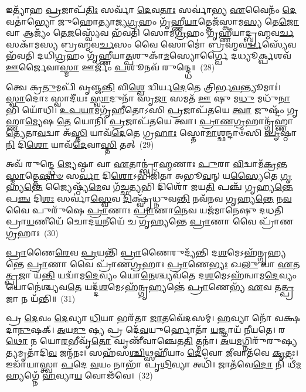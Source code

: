 𑌇𑌤𑍍𑌯𑌾᳴𑌹 \ul{𑌪𑍍𑌰}\-𑌜𑌾𑌪᳴\-\ul{𑌤𑌿𑌃} 𑌸𑌰𑍍𑌵𑌾᳴ \ul{𑌦𑍇}\-𑌵\-\ul{𑌤𑌾𑌃} 𑌸𑌰𑍍𑌵𑌾॑𑌭𑍍𑌯 \ul{𑌏}\-𑌵𑍈𑌨𑌂᳴ \ul{𑌦𑍇}\-𑌵𑌤𑌾॑𑌭𑍍𑌯𑍋 𑌜𑍁𑌹𑍋𑌤𑍍𑌯𑌾𑌜𑍍𑌯\-\ul{𑌗𑍍𑌰}\-𑌹𑌂 𑌗𑍃᳴𑌹𑍍𑌣𑍀\-\ul{𑌯𑌾}\-𑌤𑍍𑌤𑍇𑌜᳴𑌸𑍍𑌕𑌾𑌮\-\ul{𑌸𑍍𑌯} 𑌤𑍇\-\ul{𑌜𑍋} 𑌵𑌾 𑌆𑌜𑍍𑌯𑌂᳴ 𑌤𑍇\-\ul{𑌜}\-𑌸𑍍𑌵𑍍𑌯𑍇᳴𑌵 𑌭᳴𑌵𑌤𑌿 𑌸𑍋𑌮\-\ul{𑌗𑍍𑌰}\-𑌹𑌂 𑌗𑍃᳴𑌹𑍍𑌣𑍀𑌯𑌾𑌦𑍍𑌬𑍍𑌰𑌹𑍍𑌮𑌵\-\ul{𑌰𑍍𑌚}\-𑌸𑌕𑌾᳴𑌮𑌸𑍍𑌯 𑌬𑍍𑌰𑌹𑍍𑌮𑌵\-\ul{𑌰𑍍𑌚}\-𑌸𑌂 𑌵𑍈 𑌸𑍋𑌮𑍋॑ 𑌬𑍍𑌰𑌹𑍍𑌮𑌵\-\ul{𑌰𑍍𑌚}\-𑌸𑍍𑌯𑍇᳴𑌵 𑌭᳴𑌵𑌤𑌿 𑌦𑌧𑌿\-\ul{𑌗𑍍𑌰}\-𑌹𑌂 𑌗𑍃᳴𑌹𑍍𑌣𑍀𑌯𑌾\-\ul{𑌤𑍍𑌪}\-𑌶𑍁𑌕𑌾᳴\-\ul{𑌮}\-𑌸𑍍𑌯𑍋𑌰𑍍𑌗𑍍𑌵𑍈 𑌦𑌧𑍍𑌯𑍂\-\ul{𑌰𑍍𑌕𑍍𑌪}\-𑌶𑌵᳴ \ul{𑌊}\-𑌰𑍍𑌜𑍈𑌵𑌾\-\ul{𑌸𑍍𑌮𑌾} 𑌊𑌰𑍍𑌜𑌂᳴ \ul{𑌪}\-𑌶𑍂𑌨𑌵᳴ 𑌰𑍁𑌨𑍍𑌦𑍍𑌧𑍇॥~(28)

{\anuvakamend[{\-\ul{𑌉}\-\-\ul{𑌪}\-\-\ul{𑌯𑌾}\-𑌮𑌗𑍃᳴𑌹𑍀𑌤𑍋 𑌜𑍁𑌹𑍋\-\ul{𑌮𑌿} 𑌤𑍍𑌰𑌿𑌚᳴𑌤𑍍𑌵𑌾𑌰𑌿𑍞𑌶𑌚𑍍𑌚}]}%

𑌤𑍍𑌵𑍇 𑌕𑍍𑌰\-\ul{𑌤𑍁}\-𑌮𑌪𑌿᳴ 𑌵𑍃𑌞𑍍𑌜\-\ul{𑌨𑍍𑌤𑌿} 𑌵𑌿\-\ul{𑌶𑍍𑌵𑍇} 𑌦𑍍𑌵𑌿𑌰𑍍𑌯\-\ul{𑌦𑍇}\-𑌤𑍇 𑌤𑍍𑌰𑌿𑌰𑍍𑌭\-\ul{𑌵}\-𑌨𑍍𑌤𑍍𑌯𑍂𑌮𑌾𑌃॑। \ul{𑌸𑍍𑌵𑌾}\-𑌦𑍋𑌃 𑌸𑍍𑌵𑌾𑌦𑍀᳴𑌯𑌃 \ul{𑌸𑍍𑌵𑌾}\-𑌦𑍁𑌨𑌾᳴ 𑌸𑍃\-\ul{𑌜𑌾} 𑌸𑌮𑌤᳴ \ul{𑌊} 𑌷𑍁 𑌮\-\ul{𑌧𑍁} 𑌮𑌧𑍁᳴\-\ul{𑌨𑌾}\-𑌭𑌿 𑌯𑍋᳴𑌧𑌿। \ul{𑌉}\-\-\ul{𑌪}\-\-\ul{𑌯𑌾}\-𑌮𑌗𑍃᳴𑌹𑍀𑌤𑍋\-𑌽𑌸𑌿 \ul{𑌪𑍍𑌰}\-𑌜𑌾𑌪᳴𑌤𑌯𑍇 \ul{𑌤𑍍𑌵𑌾} 𑌜𑍁𑌷𑍍𑌟𑌂᳴ 𑌗𑍃𑌹𑍍𑌣𑌾\-\ul{𑌮𑍍𑌯𑍇}\-𑌷 \ul{𑌤𑍇} 𑌯𑍋𑌨𑌿𑌃᳴ \ul{𑌪𑍍𑌰}\-𑌜𑌾𑌪᳴𑌤𑌯𑍇 𑌤𑍍𑌵𑌾। \ul{𑌪𑍍𑌰𑌾}\-\-\ul{𑌣}\-\-\ul{𑌗𑍍𑌰}\-𑌹𑌾𑌨𑍍𑌗𑍃᳴𑌹𑍍𑌣𑌾\-\ul{𑌤𑍍𑌯𑍇}\-𑌤𑌾\-\ul{𑌵}\-𑌦𑍍𑌵𑌾 𑌅᳴\-\ul{𑌸𑍍𑌤𑌿} 𑌯𑌾𑌵᳴\-\ul{𑌦𑍇}\-𑌤𑍇 𑌗𑍍𑌰\-\ul{𑌹𑌾𑌃} 𑌸𑍍𑌤𑍋\-\ul{𑌮𑌾}\-𑌶𑍍𑌛𑌨𑍍𑌦𑌾𑍞᳴𑌸𑌿 \ul{𑌪𑍃}\-𑌷𑍍𑌠𑌾\-\ul{𑌨𑌿} 𑌦𑌿\-\ul{𑌶𑍋} 𑌯𑌾𑌵᳴\-\ul{𑌦𑍇}\-𑌵𑌾\-\ul{𑌸𑍍𑌤𑌿} 𑌤𑌤𑍍~(29)

𑌅𑌵᳴ 𑌰𑍁𑌨𑍍𑌦𑍍𑌧𑍇 \ul{𑌜𑍍𑌯𑍇}\-𑌷𑍍𑌠𑌾 𑌵𑌾 \ul{𑌏}\-𑌤𑌾𑌨𑍍𑌬𑍍𑌰𑌾॑\-\ul{𑌹𑍍𑌮}\-𑌣𑌾𑌃 \ul{𑌪𑍁}\-𑌰𑌾 \ul{𑌵𑌿}\-𑌦𑍍𑌵𑌾𑌮᳴\-\ul{𑌕𑍍𑌰}\-𑌨𑍍𑌤\-\ul{𑌸𑍍𑌮𑌾}\-𑌤𑍍𑌤𑍇\-\ul{𑌷𑌾}\-\-\ul{𑍞} 𑌸\-\ul{𑌰𑍍𑌵𑌾} 𑌦𑌿\-\ul{𑌶𑍋}\-\-𑌽𑌭𑌿𑌜𑌿᳴𑌤𑌾 𑌅𑌭𑍂\-\ul{𑌵}\-𑌨𑍍 𑌯\-\ul{𑌸𑍍𑌯𑍈}\-𑌤𑍇 \ul{𑌗𑍃}\-𑌹𑍍𑌯\-\ul{𑌨𑍍𑌤𑍇} 𑌜𑍍𑌯𑍈𑌷𑍍𑌠𑍍𑌯᳴\-\ul{𑌮𑍇}\-𑌵 𑌗᳴𑌚𑍍𑌛\-\ul{𑌤𑍍𑌯}\-𑌭𑌿 𑌦𑌿𑌶𑍋᳴ 𑌜𑌯\-\ul{𑌤𑌿} 𑌪𑌞𑍍𑌚᳴ 𑌗𑍃𑌹𑍍𑌯\-\ul{𑌨𑍍𑌤𑍇} 𑌪\-\ul{𑌞𑍍𑌚} 𑌦𑌿\-\ul{𑌶𑌃} 𑌸𑌰𑍍𑌵𑌾॑\-\ul{𑌸𑍍𑌵𑍇}\-𑌵 \ul{𑌦𑌿}\-𑌕𑍍𑌷𑍍𑌵𑍃᳴𑌧𑍍𑌨𑍁𑌵\-\ul{𑌨𑍍𑌤𑌿} 𑌨𑌵᳴𑌨𑌵 𑌗𑍃𑌹𑍍𑌯\-\ul{𑌨𑍍𑌤𑍇} 𑌨\-\ul{𑌵} 𑌵𑍈 𑌪𑍁𑌰𑍁᳴𑌷𑍇 \ul{𑌪𑍍𑌰𑌾}\-𑌣𑌾𑌃 \ul{𑌪𑍍𑌰𑌾}\-𑌣𑌾\-\ul{𑌨𑍇}\-𑌵 𑌯𑌜᳴𑌮𑌾𑌨𑍇𑌷𑍁 𑌦𑌧𑌤𑌿 𑌪𑍍𑌰𑌾\-\ul{𑌯}\-𑌣𑍀𑌯𑍇᳴ 𑌚𑍋𑌦\-\ul{𑌯}\-𑌨𑍀𑌯𑍇᳴ 𑌚 𑌗𑍃𑌹𑍍𑌯𑌨𑍍𑌤𑍇 \ul{𑌪𑍍𑌰𑌾}\-𑌣𑌾 𑌵𑍈 𑌪𑍍𑌰𑌾᳴𑌣\-\ul{𑌗𑍍𑌰}\-𑌹𑌾𑌃~(30)

\-\ul{𑌪𑍍𑌰𑌾}\-𑌣𑍈\-\ul{𑌰𑍇}\-𑌵 \ul{𑌪𑍍𑌰}\-𑌯𑌨𑍍𑌤𑌿᳴ \ul{𑌪𑍍𑌰𑌾}\-𑌣𑍈𑌰𑍁𑌦𑍍𑌯᳴𑌨𑍍𑌤𑌿 𑌦\-\ul{𑌶}\-𑌮𑍇\-𑌽𑌹᳴𑌨𑍍𑌗𑍃𑌹𑍍𑌯𑌨𑍍𑌤𑍇 \ul{𑌪𑍍𑌰𑌾}\-𑌣𑌾 𑌵𑍈 𑌪𑍍𑌰𑌾᳴𑌣\-\ul{𑌗𑍍𑌰}\-𑌹𑌾𑌃 \ul{𑌪𑍍𑌰𑌾}\-𑌣𑍇\-\ul{𑌭𑍍𑌯𑌃} 𑌖\-\ul{𑌲𑍁} 𑌵𑌾 \ul{𑌏}\-𑌤\-\ul{𑌤𑍍𑌪𑍍𑌰}\-𑌜𑌾 𑌯᳴\-\ul{𑌨𑍍𑌤𑌿} 𑌯𑌦𑍍𑌵𑌾᳴𑌮\-\ul{𑌦𑍇}\-𑌵𑍍𑌯𑌂 𑌯𑍋\-\ul{𑌨𑍇}\-𑌶𑍍𑌚𑍍𑌯𑌵᳴𑌤𑍇 𑌦\-\ul{𑌶}\-𑌮𑍇\-𑌽𑌹᳴𑌨𑍍𑌵𑌾𑌮\-\ul{𑌦𑍇}\-𑌵𑍍𑌯𑌂 𑌯𑍋𑌨𑍇॑𑌶𑍍𑌚𑍍𑌯𑌵\-\ul{𑌤𑍇} 𑌯𑌦𑍍𑌦᳴\-\ul{𑌶}\-𑌮𑍇\-𑌽𑌹᳴\-\ul{𑌨𑍍𑌗𑍃}\-𑌹𑍍𑌯𑌨𑍍𑌤𑍇॑ \ul{𑌪𑍍𑌰𑌾}\-𑌣𑍇𑌭𑍍𑌯᳴ \ul{𑌏}\-𑌵 𑌤\-\ul{𑌤𑍍𑌪𑍍𑌰}\-𑌜𑌾 𑌨 𑌯᳴𑌨𑍍𑌤𑌿॥~(31)

{\anuvakamend[{𑌤𑌤𑍍𑌪𑍍𑌰𑌾᳴𑌣\-\ul{𑌗𑍍𑌰}\-𑌹𑌾𑌃 \ul{𑌸}\-𑌪𑍍𑌤𑌤𑍍𑌰𑌿𑍞᳴𑌶𑌚𑍍𑌚}]}%

𑌪𑍍𑌰 \ul{𑌦𑍇}\-𑌵𑌂 \ul{𑌦𑍇}\-𑌵𑍍𑌯𑌾 \ul{𑌧𑌿}\-𑌯𑌾 𑌭𑌰᳴𑌤𑌾 \ul{𑌜𑌾}\-𑌤𑌵𑍇᳴𑌦𑌸𑌮𑍍। \ul{𑌹}\-𑌵𑍍𑌯𑌾 𑌨𑍋᳴ 𑌵𑌕𑍍𑌷𑌦𑌾\-\ul{𑌨𑍁}\-𑌷𑌕𑍍। \ul{𑌅}\-𑌯\-\ul{𑌮𑍁} 𑌷𑍍𑌯 𑌪𑍍𑌰 𑌦𑍇᳴\-\ul{𑌵}\-𑌯𑍁𑌰𑍍\mbox{}𑌹𑍋𑌤𑌾᳴ \ul{𑌯}\-𑌜𑍍𑌞𑌾𑌯᳴ 𑌨𑍀𑌯𑌤𑍇। 𑌰\-\ul{𑌥𑍋} 𑌨 𑌯𑍋\-\ul{𑌰}\-𑌭𑍀𑌵𑍃᳴\-\ul{𑌤𑍋} 𑌘𑍃𑌣𑍀᳴𑌵𑌾𑌞𑍍𑌚𑍇𑌤\-\ul{𑌤𑌿} 𑌤𑍍𑌮𑌨𑌾॑। \ul{𑌅}\-𑌯\-\ul{𑌮}\-𑌗𑍍𑌨𑌿𑌰𑍁᳴𑌰𑍁𑌷𑍍𑌯\-\ul{𑌤𑍍𑌯}\-𑌮𑍃𑌤𑌾᳴𑌦𑌿\-\ul{𑌵} 𑌜𑌨𑍍𑌮᳴𑌨𑌃। 𑌸𑌹᳴𑌸\-\ul{𑌶𑍍𑌚𑌿}\-𑌥𑍍𑌸𑌹𑍀᳴𑌯𑌾𑌂 \ul{𑌦𑍇}\-𑌵𑍋 \ul{𑌜𑍀}\-𑌵𑌾𑌤᳴𑌵𑍇 \ul{𑌕𑍃}\-𑌤𑌃। 𑌇𑌡𑌾᳴𑌯𑌾𑌸𑍍𑌤𑍍𑌵𑌾 \ul{𑌪}\-𑌦𑍇 \ul{𑌵}\-𑌯𑌂 𑌨𑌾𑌭𑌾᳴ 𑌪𑍃\-\ul{𑌥𑌿}\-𑌵𑍍𑌯𑌾 𑌅𑌧𑌿᳴। 𑌜𑌾𑌤᳴𑌵𑍇\-\ul{𑌦𑍋} 𑌨𑌿 𑌧𑍀᳴\-\ul{𑌮}\-𑌹𑍍𑌯𑌗𑍍𑌨𑍇᳴ \ul{𑌹}\-𑌵𑍍𑌯𑌾\-\ul{𑌯} 𑌵𑍋𑌢᳴𑌵𑍇।~(32)

